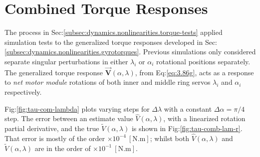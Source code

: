 \section{Combined Torque Responses}
\label{app:tau-comb}
The process in Sec:\ref{subsec:dynamics.nonlinearities.torque-tests} applied simulation tests to the generalized torque responses developed in Sec:\ref{subsec:dynamics.nonlinearities.gyrotorques}. Previous simulations only considered separate singular perturbations in either $\lambda_i$ or $\alpha_i$ rotational positions separately. The generalized torque response $\vec{\mathbf{V}}(\alpha,\lambda)$, from Eq:\ref{eq:3.86g}, acts as a response to \emph{net motor module} rotations of both inner and middle ring servos $\lambda_i$ and $\alpha_i$ respectively.
\par
Fig:\ref{fig:tau-com-lambda} plots varying steps for $\Delta\lambda$ with a constant $\Delta\alpha=\pi/4$ step. The error between an estimate value $\hat{V}(\alpha,\lambda)$, with a linearized rotation partial derivative, and the true $\widetilde{V}(\alpha,\lambda)$ is shown in Fig:\ref{fig:tau-comb-lam-r}. That error is mostly of the order $\times 10^{-4}~[\text{N.m}]$; whilst both $\hat{V}(\alpha,\lambda)$ and $\widetilde{V}(\alpha,\lambda)$ are in the order of $\times 10^{-1}~[\text{N.m}]$.

